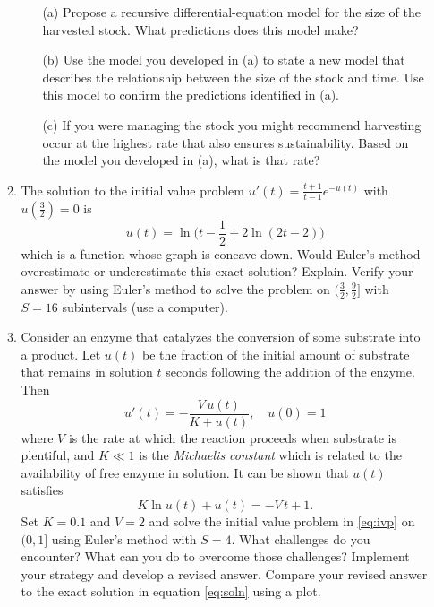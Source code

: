 \documentclass[11pt]{article}
\begin{document}
\begin{enumerate}
\begin{enumerate}
        \begin{itemize}
          \item[(a)] Propose a recursive differential-equation model for the size of the harvested stock. What predictions does this model make?
          \item[(b)] Use the model you developed in (a) to state a new model that describes the relationship between the size of the stock and time. Use this model to confirm the predictions identified in (a).
          \item[(c)] If you were managing the stock you might recommend harvesting occur at the highest rate that also ensures sustainability. Based on the model you developed in (a), what is that rate? 
        \end{itemize}

      \item The solution to the initial value problem $u'(t) = \frac{t+1}{t-1} e^{-u(t)}$ with $u(\frac{3}{2}) = 0$ is 
        \[
          u(t) = \ln \bigg( t-\frac{1}{2} + 2\ln (2t-2)\bigg)
        \]
        which is a function whose graph is concave down. Would Euler's method overestimate or underestimate this exact solution? Explain. Verify your answer by using Euler's method to solve the problem on $(\frac{3}{2}, \frac{9}{2}]$ with $S=16$ subintervals (use a computer).
      \item 	Consider an enzyme that catalyzes the conversion of some substrate into a product. Let $u(t)$ be the fraction of the initial amount of substrate that remains in solution $t$ seconds following the addition of the enzyme. Then 
        \begin{equation}\label{eq:ivp}
          u'(t) = -\frac{V \, u(t)}{K + u(t)}, \quad u(0) = 1
        \end{equation}
        where $V$ is the rate at which the reaction proceeds when substrate is plentiful, and $K \ll 1$ is the {\it Michaelis constant} which is related to the availability of free enzyme in solution. It can be shown that $u(t)$ satisfies
        \begin{equation}\label{eq:soln}
          K \ln u(t) + u(t) = -V\, t + 1.
        \end{equation}
        Set $K=0.1$ and $V=2$ and solve the initial value problem in \eqref{eq:ivp} on $(0,1]$ using Euler's method with $S=4$. What challenges do you encounter? What can you do to overcome those challenges? Implement your strategy and develop a revised answer. Compare your revised answer to the exact solution in equation \eqref{eq:soln} using a plot.  
    \end{enumerate}


\end{enumerate}
\end{document}
